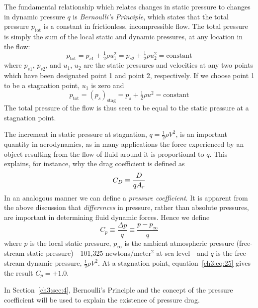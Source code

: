 The fundamental relationship which relates changes in static pressure to changes in
dynamic pressure $q$ is \emph{Bernoulli's Principle}, which states that the total
pressure $p_{\mathrm{tot}}$ is a constant in frictionless, incompressible flow. The
total pressure is simply the sum of the local static and dynamic pressures, at any
location in the flow:
\begin{equation}\label{ch3:eq:22}
p_{\mathrm{tot}} = p_{s1} + \tfrac{1}{2}\rho u_1^{2}
  = p_{s2} + \tfrac{1}{2}\rho u_2^{2} = \text{constant}
\end{equation}
where $p_{s1}$, $p_{s2}$, and $u_1$, $u_2$ are the static pressures and velocities at
any two points which have been designated point 1 and point 2, respectively. If we
choose point 1 to be a stagnation point, $u_1$ is zero and
\begin{equation}\label{ch3:eq:23}
p_{\mathrm{tot}} = (p_s)_{\mathrm{stag}} = p_s + \tfrac{1}{2}\rho u^{2}
  = \text{constant}
\end{equation}
The total pressure of the flow is thus seen to be equal to the static pressure at a
stagnation point.

The increment in static pressure at stagnation, $q = \tfrac{1}{2}\rho V^{2}$, is an
important quantity in aerodynamics, as in many applications the force experienced by
an object resulting from the flow of fluid around it is proportional to $q$. This
explains, for instance, why the drag coefficient is defined as
\begin{equation}\label{ch3:eq:24}
C_{D} \equiv \frac{D}{qA_r}
\end{equation}
In an analogous manner we can define a \emph{pressure coefficient}. It is apparent
from the above discussion that \emph{differences} in pressure, rather than absolute
pressures, are important in determining fluid dynamic forces. Hence we define
\begin{equation}\label{ch3:eq:25}
C_p \equiv \frac{\Delta p}{q} \equiv \frac{p - p_\infty}{q}
\end{equation}
where $p$ is the local static pressure, $p_\infty$ is the ambient atmospheric
pressure (free-stream static pressure)---101,325 newtons/meter$^{2}$ at sea
level---and $q$ is the free-stream dynamic pressure, $\tfrac{1}{2}\rho V^{2}$. At a
stagnation point, equation~\eqref{ch3:eq:25} gives the result $C_p = +1.0$.

In Section~\ref{ch3:sec:4}, Bernoulli's Principle and the concept of the pressure
coefficient will be used to explain the existence of pressure drag.

